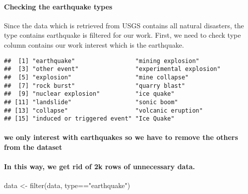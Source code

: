 \documentclass[
]{article}
\newenvironment{Shaded}{\begin{snugshade}}{\end{snugshade}}
\newcommand{\FunctionTok}[1]{\textcolor[rgb]{0.00,0.00,0.00}{#1}}
\newcommand{\NormalTok}[1]{#1}
\newcommand{\OtherTok}[1]{\textcolor[rgb]{0.56,0.35,0.01}{#1}}
\newcommand{\SpecialCharTok}[1]{\textcolor[rgb]{0.00,0.00,0.00}{#1}}
\newcommand{\StringTok}[1]{\textcolor[rgb]{0.31,0.60,0.02}{#1}}
\begin{document}
\hypertarget{checking-the-earthquake-types}{%
\paragraph{Checking the earthquake
types}\label{checking-the-earthquake-types}}

Since the data which is retrieved from USGS contains all natural
disasters, the type contains earthquake is filtered for our work. First,
we need to check type column contains our work interest which is the
earthquake.

\begin{Shaded}
\end{Shaded}

\begin{verbatim}
##  [1] "earthquake"                 "mining explosion"          
##  [3] "other event"                "experimental explosion"    
##  [5] "explosion"                  "mine collapse"             
##  [7] "rock burst"                 "quarry blast"              
##  [9] "nuclear explosion"          "ice quake"                 
## [11] "landslide"                  "sonic boom"                
## [13] "collapse"                   "volcanic eruption"         
## [15] "induced or triggered event" "Ice Quake"
\end{verbatim}

\hypertarget{we-only-interest-with-earthquakes-so-we-have-to-remove-the-others-from-the-dataset}{%
\paragraph{we only interest with earthquakes so we have to remove the
others from the
dataset}\label{we-only-interest-with-earthquakes-so-we-have-to-remove-the-others-from-the-dataset}}

\hypertarget{in-this-way-we-get-rid-of-2k-rows-of-unnecessary-data.}{%
\paragraph{In this way, we get rid of 2k rows of unnecessary
data.}\label{in-this-way-we-get-rid-of-2k-rows-of-unnecessary-data.}}

\begin{Shaded}
\begin{Highlighting}[]
\NormalTok{data }\OtherTok{\textless{}{-}} \FunctionTok{filter}\NormalTok{(data, type}\SpecialCharTok{==}\StringTok{"earthquake"}\NormalTok{)}
\end{Highlighting}
\end{Shaded}
\end{document}
